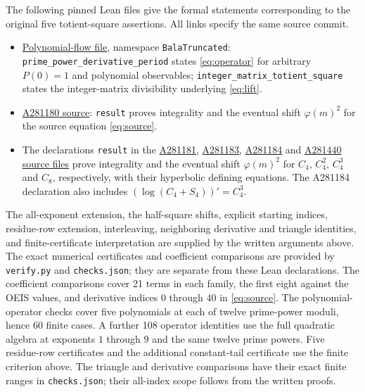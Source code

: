 \documentclass[11pt]{article}
\newcommand{\ph}{\varphi}
\begin{document}
The following pinned Lean files give the formal statements corresponding
to the original five totient-square assertions. All links specify
the same source commit.
\begin{itemize}
\item \href{https://github.com/the-omega-institute/trureturing/blob/92de86888730265f84e24d28bdb67546c543a966/D5/S1/Recurrence/Periodic/AutonomousDerivationTotientSquarePeriod.lean}{Polynomial-flow file}, namespace \texttt{BalaTruncated}:
\texttt{prime\_power\_derivative\_period} states
\eqref{eq:operator} for arbitrary $P(0)=1$ and polynomial observables;
\texttt{integer\_matrix\_totient\_square} states the
integer-matrix divisibility underlying \eqref{eq:lift}.
\item \href{https://github.com/the-omega-institute/trureturing/blob/92de86888730265f84e24d28bdb67546c543a966/D5/S1/Recurrence/Periodic/BalaA281180TotientSquarePeriod.lean}{A281180 source}:
\texttt{result} proves integrality and the eventual shift $\ph(m)^2$
for the source equation \eqref{eq:source}.
\item The declarations \texttt{result} in the
\href{https://github.com/the-omega-institute/trureturing/blob/92de86888730265f84e24d28bdb67546c543a966/D5/S1/Recurrence/Periodic/BalaA281181TotientSquarePeriod.lean}{A281181},
\href{https://github.com/the-omega-institute/trureturing/blob/92de86888730265f84e24d28bdb67546c543a966/D5/S1/Recurrence/Periodic/BalaA281183TotientSquarePeriod.lean}{A281183},
\href{https://github.com/the-omega-institute/trureturing/blob/92de86888730265f84e24d28bdb67546c543a966/D5/S1/Recurrence/Periodic/BalaA281184TotientSquarePeriod.lean}{A281184} and
\href{https://github.com/the-omega-institute/trureturing/blob/92de86888730265f84e24d28bdb67546c543a966/D5/S1/Recurrence/Periodic/BalaA281440TotientSquarePeriod.lean}{A281440 source files}
prove integrality and the eventual shift $\ph(m)^2$ for $C_4$,
$C_4^2$, $C_4^3$ and $C_8$, respectively, with their hyperbolic
defining equations. The A281184 declaration also includes
$(\log(C_4+S_4))'=C_4^3$.
\end{itemize}
The all-exponent extension, the half-square shifts, explicit starting
indices, residue-row extension, interleaving, neighboring derivative and
triangle identities, and finite-certificate interpretation
are supplied by the written arguments above. The exact numerical
certificates and coefficient comparisons are provided by
\texttt{verify.py} and \texttt{checks.json}; they are separate from
these Lean declarations. The coefficient comparisons cover 21
terms in each family, the first eight against the OEIS values,
and derivative indices $0$ through $40$ in \eqref{eq:source}.
The polynomial-operator checks cover five polynomials at each of twelve
prime-power moduli, hence 60 finite cases. A further 108 operator
identities use the full quadratic algebra at exponents $1$ through $9$
and the same twelve prime powers. Five residue-row certificates and
the additional constant-tail certificate use the finite criterion above.
The triangle and derivative comparisons have their exact finite ranges
in \texttt{checks.json}; their all-index scope follows from the written proofs.
\end{document}
